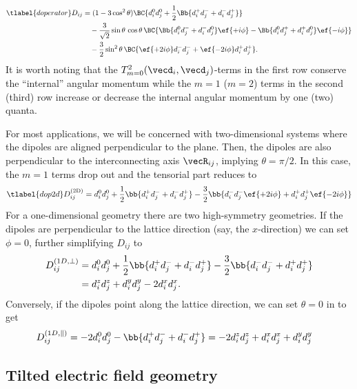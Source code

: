\begin{align}\tlabel{doperator}
    D_{ij} &= (1-3\cos^2 \theta) \BC{ d_i^0 d_j^0 + \frac{1}{2}\Bb{d_i^+ d_j^- + d_i^- d_j^+} } \\
           &\quad -\frac{3}{\sqrt{2}}\sin\theta \,\cos\theta\, \BC{ \Bb{ d_i^0 d_j^- + d_i^- d_j^0 } \ef{+i\phi} - \Bb{ d_i^0 d_j^+ + d_i^+ d_j^0 } \ef{-i\phi} } \\
           &\quad -\frac{3}{2}\sin^2\theta \, \BC{ \ef{+2i\phi} d_i^- d_j^- + \ef{-2i\phi} d_i^+ d_j^+ }.
\end{align}
It is worth noting that the $T^2_{m=0}(\vecd_i, \vecd_j)$-terms in the first row conserve the ``internal'' angular momentum while the $m=1$ ($m=2$) terms in the second (third) row increase or decrease the internal angular momentum by one (two) quanta.

For most applications, we will be concerned with two-dimensional systems where the dipoles are aligned perpendicular to the plane. Then, the dipoles are also perpendicular to the interconnecting axis $\vecR_{ij}$, implying $\theta = \pi/2$. In this case, the $m=1$ terms drop out and the tensorial part reduces to
\begin{align} \tlabel{dop2d}
    D^\text{(2D)}_{ij} = d_i^0 d_j^0 + \frac{1}{2}\bb{d_i^+ d_j^- + d_i^- d_j^+} -\frac{3}{2} \bb{ d_i^- d_j^- \ef{+2i\phi} + d_i^+ d_j^+ \ef{-2i\phi} }
\end{align}
For a one-dimensional geometry there are two high-symmetry geometries. If the dipoles are perpendicular to the lattice direction (say, the $x$-direction) we can set $\phi=0$, further simplifying $D_{ij}$ to
\begin{align}
    D_{ij}^{(1D,\perp)} &= d_i^0 d_j^0 + \frac{1}{2}\bb{d_i^+ d_j^- + d_i^- d_j^+} -\frac{3}{2} \bb{d_i^- d_j^- + d_i^+ d_j^+} \\
 &= d_i^z d_j^z + d_i^y d_j^y - 2 d_i^x d_j^x.
\end{align}
Conversely, if the dipoles point along the lattice direction, we can set $\theta=0$ in  to get
\begin{align}
    D^{(1D,\parallel)}_{ij} &= -2 d_i^0 d_j^0 - \bb{d_i^+ d_j^- + d_i^- d_j^+} = -2 d_i^z d_j^z+ d_i^x d_j^x + d_i^y d_j^y
\end{align}

\subsection{Tilted electric field geometry}

